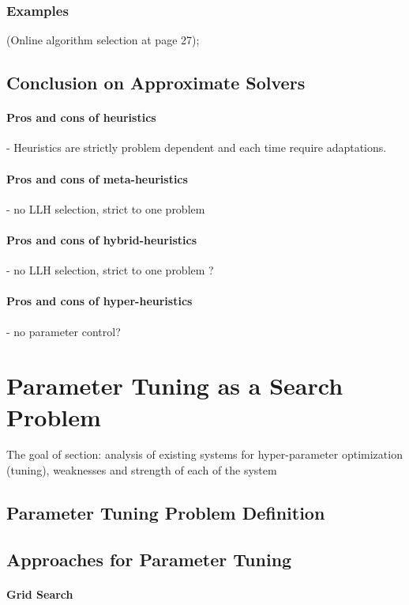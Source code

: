 \subsubsection{Examples}%
\cite{surv:drake2019recent} (Online algorithm selection at page 27); \cite{surv:kerschke2019automated}

\subsection{Conclusion on Approximate Solvers}
\paragraph{Pros and cons of heuristics} - Heuristics are strictly problem dependent and each time require adaptations.
\paragraph{Pros and cons of meta-heuristics} - no LLH selection, strict to one problem
\paragraph{Pros and cons of hybrid-heuristics} - no LLH selection, strict to one problem ? 
\paragraph{Pros and cons of hyper-heuristics} - no parameter control?


\section{Parameter Tuning as a Search Problem}\label{bg: parameter tuning}
The goal of section: analysis of existing systems for hyper-parameter optimization (tuning), weaknesses and strength of each of the system

\subsection{Parameter Tuning Problem Definition}
\subsection{Approaches for Parameter Tuning}
\paragraph{Grid Search}
